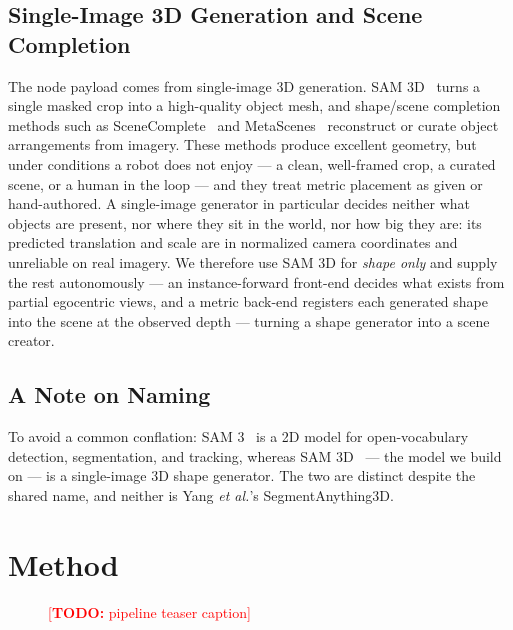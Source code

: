 \documentclass[conference]{IEEEtran}
\newcommand{\todo}[1]{\textcolor{red}{[\textbf{TODO:} #1]}}
\begin{document}
\subsection{Single-Image 3D Generation and Scene Completion}
The node payload comes from single-image 3D generation. SAM 3D~\cite{sam3d}
turns a single masked crop into a high-quality object mesh, and shape/scene
completion methods such as SceneComplete~\cite{scenecomplete} and
MetaScenes~\cite{metascenes} reconstruct or curate object arrangements from
imagery. These methods produce excellent geometry, but under conditions a robot
does not enjoy --- a clean, well-framed crop, a curated scene, or a human in the
loop --- and they treat metric placement as given or hand-authored. A
single-image generator in particular decides neither what objects are present,
nor where they sit in the world, nor how big they are: its predicted translation
and scale are in normalized camera coordinates and unreliable on real
imagery. We therefore use SAM 3D for \emph{shape only} and supply the rest
autonomously --- an instance-forward front-end decides what exists from partial
egocentric views, and a metric back-end registers each generated shape into the
scene at the observed depth --- turning a shape generator into a scene creator.

\subsection{A Note on Naming}
To avoid a common conflation: SAM 3~\cite{sam3} is a 2D model for
open-vocabulary detection, segmentation, and tracking, whereas
SAM 3D~\cite{sam3d} --- the model we build on --- is a single-image 3D shape
generator. The two are distinct despite the shared name, and neither is Yang
\emph{et al.}'s SegmentAnything3D.

\section{Method}
\begin{figure}[htbp]
  \centering
  \caption{\todo{pipeline teaser caption}}
  \label{fig:pipeline}
\end{figure}
\end{document}
